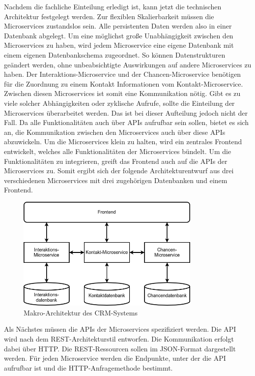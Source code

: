 Nachdem die fachliche Einteilung erledigt ist, kann jetzt die technischen Architektur festgelegt werden. Zur flexiblen Skalierbarkeit müssen die Microservices zustandslos sein. Alle persistenten Daten werden also in einer Datenbank abgelegt. Um eine möglichst große Unabhängigkeit zwischen den Microservices zu haben, wird jedem Microservice eine eigene Datenbank mit einem eigenen Datenbankschema zugeordnet. So können Datenstrukturen geändert werden, ohne unbeabsichtigte Auswirkungen auf andere Microservices zu haben. Der Interaktions-Microservice und der Chancen-Microservice benötigen für die Zuordnung zu einem Kontakt Informationen vom Kontakt-Microservice. Zwischen diesen Microservices ist somit eine Kommunikation nötig. Gibt es zu viele solcher Abhängigkeiten oder zyklische Aufrufe, sollte die Einteilung der Microservices überarbeitet werden. Das ist bei dieser Aufteilung jedoch nicht der Fall. Da alle Funktionalitäten auch über \acp{API} aufrufbar sein sollen, bietet es sich an, die Kommunikation zwischen den Microservices auch über diese \acp{API} abzuwickeln. Um die Microservices klein zu halten, wird ein zentrales Frontend entwickelt, welches alle Funktionalitäten der Microservices bündelt. Um die Funktionalitäten zu integrieren, greift das Frontend auch auf die \acp{API} der Microservices zu. Somit ergibt sich der folgende Architekturentwurf aus drei verschiedenen Microservices mit drei zugehörigen Datenbanken und einem Frontend.

\begin{figure}[H] 
    \centering
    \includegraphics[width=0.8\textwidth]{figures/CRMEntwurf.png}
    \caption{Makro-Architektur des CRM-Systems}
\end{figure}

Als Nächstes müssen die \acp{API} der Microservices spezifiziert werden. Die \ac{API} wird nach dem \ac{REST}-Architekturstil entworfen. Die Kommunikation erfolgt dabei über \ac{HTTP}. Die \ac{REST}-Ressourcen sollen im \ac{JSON}-Format dargestellt werden. Für jeden Microservice werden die Endpunkte, unter der die \ac{API} aufrufbar ist und die HTTP-Anfragemethode bestimmt.

